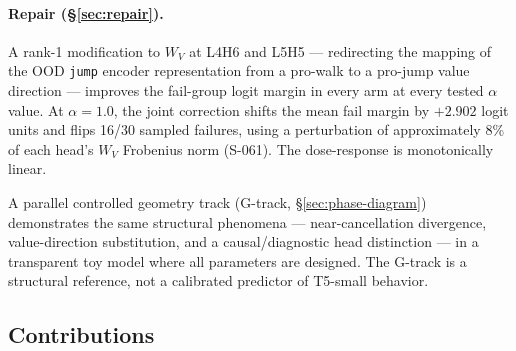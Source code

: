\paragraph{Repair (\S\ref{sec:repair}).}
A rank-1 modification to $W_V$ at L4H6 and L5H5 --- redirecting the mapping of the OOD
\texttt{jump} encoder representation from a pro-walk to a pro-jump value direction ---
improves the fail-group logit margin in every arm at every tested $\alpha$ value.
At $\alpha=1.0$, the joint correction shifts the mean fail margin by $+2.902$ logit units
and flips 16/30 sampled failures, using a perturbation of approximately 8\% of each
head's $W_V$ Frobenius norm (S-061).
The dose-response is monotonically linear.

A parallel controlled geometry track (G-track, \S\ref{sec:phase-diagram}) demonstrates
the same structural phenomena --- near-cancellation divergence, value-direction
substitution, and a causal/diagnostic head distinction --- in a transparent toy
model where all parameters are designed.
The G-track is a structural reference, not a calibrated predictor of T5-small behavior.

\subsection{Contributions}

